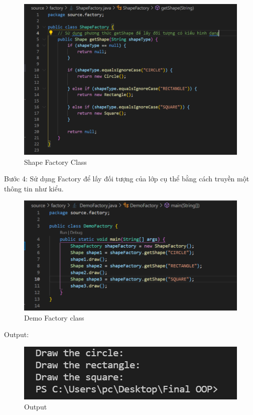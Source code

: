 \begin{figure}[!htb]
    \centering
    \includegraphics[width=\textwidth]{fig/Factory/shape_factory_class.png}
    \caption{Shape Factory Class}
    \label{fig:shape_factory_class}
\end{figure}

Bước 4: Sử dụng Factory để lấy đối tượng của lớp cụ thể bằng cách truyền một thông tin như kiểu.

\begin{figure}[!htb]
    \centering
    \includegraphics[width=\textwidth]{fig/Factory/demo_factory_class.png}
    \caption{Demo Factory class}
    \label{fig:demo_factory_class}
\end{figure}

\newpage
Output:
\begin{figure}[!htb]
    \centering
    \includegraphics[width=\textwidth]{fig/Factory/factory_output.png}
    \caption{Output}
    \label{fig:factory_output}
\end{figure}

